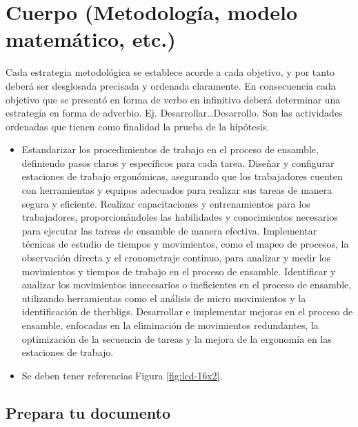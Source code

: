   \section{Cuerpo (Metodología, modelo matemático, etc.)}
  
  Cada estrategia metodológica se establece acorde a cada objetivo, y por tanto deberá ser desglosada precisada y ordenada claramente. En consecuencia cada objetivo que se presentó en forma de verbo en infinitivo deberá determinar una estrategia en forma de adverbio. Ej. Desarrollar…Desarrollo. Son las actividades ordenadas que tienen como finalidad la prueba de la hipótesis. 
  
  \begin{itemize}
      \item Estandarizar los procedimientos de trabajo en el proceso de ensamble, definiendo pasos claros y específicos para cada tarea.
  Diseñar y configurar estaciones de trabajo ergonómicas, asegurando que los trabajadores cuenten con herramientas y equipos adecuados para realizar sus tareas de manera segura y eficiente.
  Realizar capacitaciones y entrenamientos para los trabajadores, proporcionándoles las habilidades y conocimientos necesarios para ejecutar las tareas de ensamble de manera efectiva.
  Implementar técnicas de estudio de tiempos y movimientos, como el mapeo de procesos, la observación directa y el cronometraje continuo, para analizar y medir los movimientos y tiempos de trabajo en el proceso de ensamble.
  Identificar y analizar los movimientos innecesarios o ineficientes en el proceso de ensamble, utilizando herramientas como el análisis de micro movimientos y la identificación de therbligs.
  Desarrollar e implementar mejoras en el proceso de ensamble, enfocadas en la eliminación de movimientos redundantes, la optimización de la secuencia de tareas y la mejora de la ergonomía en las estaciones de trabajo.
      \item Se deben tener referencias Figura \ref{fig:lcd-16x2}.
  \end{itemize}
  
           
  \subsection{Prepara tu documento}
  
